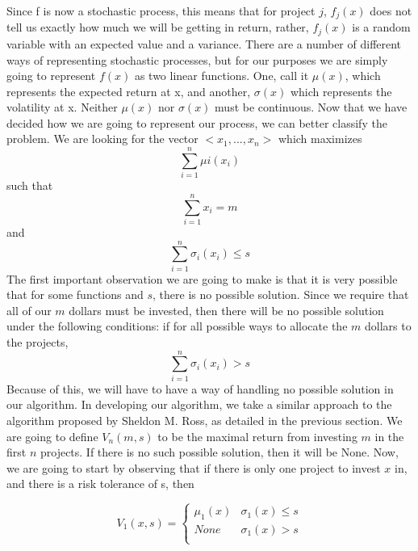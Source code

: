 \documentclass{article}
\begin{document}
\breakline
Since f is now a stochastic process, this means that for project $j$,  $f_{j}(x)$ does not tell us exactly how much we will be getting in return, rather, $f_{j}(x)$ is a random variable with an expected value and a variance. There are a number of different ways of representing stochastic processes, but for our purposes we are simply going to represent $f(x)$ as two linear functions. One, call it $\mu(x)$, which represents the expected return at x, and another, $\sigma(x)$ which represents the volatility at x.  Neither $\mu(x)$ nor $\sigma(x)$ must be continuous.  
\newline
Now that we have decided how we are going to represent our process, we can better classify the problem.  We are looking for the vector $<x_{1},...,x_{n}>$ which maximizes 
$$\sum_{i=1}^{n} \mu{i}(x_{i})$$
such that
$$\sum_{i=1}^{n}x_{i} = m$$
and
$$\sum_{i=1}^{n} \sigma_{i}(x_{i}) \leq s$$
\newline
The first important observation we are going to make is that it is very possible that for some functions and $s$, there is no possible solution. Since we require that all of our $m$ dollars must be invested, then there will be no possible solution under the following conditions:
\newline
if for all possible ways to allocate the $m$ dollars to the projects, 
$$\sum_{i=1}^{n} \sigma_{i}(x_{i}) > s$$
Because of this, we will have to have a way of handling no possible solution in our algorithm.  
\newline
In developing our algorithm, we take a similar approach to the algorithm proposed by Sheldon M. Ross, as detailed in the previous section.
\newline
We are going to define $V_{n}(m, s)$ to be the maximal return from investing $m$ in the first $n$ projects.  If there is no such possible solution, then it will be None.
\newline
Now, we are going to start by observing that if there is only one project to invest $x$ in, and there is a risk tolerance of s, then 

\[V_{1}(x, s) =  \begin{cases} 
      \mu_{1}(x) & \sigma_{1}(x) \leq s \\
      None & \sigma_{1}(x) > s \\
   \end{cases}
\]
\end{document}
